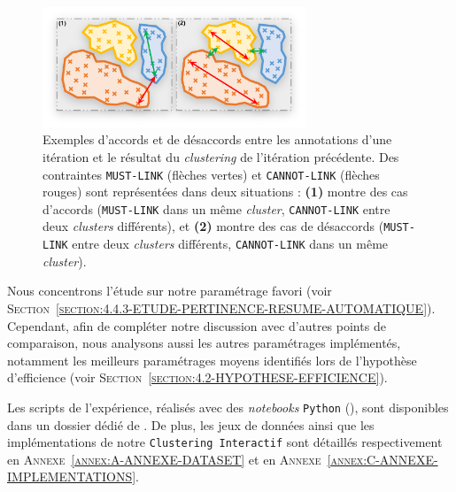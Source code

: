 			\begin{figure}[!htb]
				\centering
				\includegraphics[width=0.70\textwidth]{figures/example-accord-annotation-clustering}
				\caption{
					Exemples d'accords et de désaccords entre les annotations d'une itération et le résultat du \textit{clustering} de l'itération précédente.
					Des contraintes \texttt{MUST-LINK} (flèches vertes) et \texttt{CANNOT-LINK} (flèches rouges) sont représentées dans deux situations : \textbf{(1)} montre des cas d'accords (\texttt{MUST-LINK} dans un même \textit{cluster}, \texttt{CANNOT-LINK} entre deux \textit{clusters} différents), et \textbf{(2)} montre des cas de désaccords (\texttt{MUST-LINK} entre deux \textit{clusters} différents, \texttt{CANNOT-LINK} dans un même \textit{cluster}).
				}
				\label{figure:4.5.1-ETUDE-RENTABILITE-ACCORD-ANNOTATION-CLUSTERING-EXEMPLE}
			\end{figure}
			
			\begin{leftBarIdea}
				Nous concentrons l'étude sur notre paramétrage favori (voir \textsc{Section~\ref{section:4.4.3-ETUDE-PERTINENCE-RESUME-AUTOMATIQUE}}).
				Cependant, afin de compléter notre discussion avec d'autres points de comparaison, nous analysons aussi les autres paramétrages implémentés, notamment les meilleurs paramétrages moyens identifiés lors de l'hypothèse d'efficience (voir \textsc{Section~\ref{section:4.2-HYPOTHESE-EFFICIENCE}}).
			\end{leftBarIdea}
			
			\begin{leftBarInformation}
				Les scripts de l'expérience, réalisés avec des \textit{notebooks} \texttt{Python} (\cite{van-rossum-drake:2009:python-reference-manual}), sont disponibles dans un dossier dédié de \cite{schild:2021:cognitivefactory-interactiveclusteringcomparativestudy}.
				De plus, les jeux de données ainsi que les implémentations de notre \texttt{Clustering Interactif} sont détaillés respectivement en \textsc{Annexe~\ref{annex:A-ANNEXE-DATASET}} et en \textsc{Annexe~\ref{annex:C-ANNEXE-IMPLEMENTATIONS}}.
			\end{leftBarInformation}

